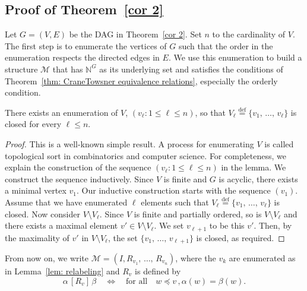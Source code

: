 \documentclass[AHL,Unicode,longabstracts,published]{cedram}
\newcommand*{\defeq}{\stackrel{\mathrm{def}}{=}}
\newcommand*\N{\mathbb{N}}
\newcommand*\MM{\mathcal{M}}
\newcommand*\M{\MM}
\newcommand*\N{\mathbb{N}}
\begin{document}
\subsection{Proof of Theorem~\ref{cor 2}}\label{sec:DAG-exchangeability}

Let $G = (V,E)$ be the DAG in Theorem~\ref{cor 2}. Set $n$ to the cardinality of $V$. The first step is to enumerate the vertices of $G$ such that the order in the enumeration respects the directed edges in $E$. We use this enumeration to build a structure $\M$ that has $\N^G$ as its underlying set and satisfies the conditions of Theorem~\ref{thm: CraneTowsner equivalence relations}, especially the orderly condition.

\begin{lemm}\label{lem: relabeling}
There exists an enumeration of $V$, $(v_\ell : 1 \leq \ell \leq n)$, so that\linebreak
$V_\ell
\defeq \{v_1,\,\ldots,\,v_\ell\}$ is closed for every $\ell \leq n$.
\end{lemm}

\begin{proof}
This is a well-known simple result. A process for enumerating $V$ is called topological sort in combinatorics and computer science. For completeness, we explain the construction of the sequence $(v_\ell : 1 \leq \ell \leq n)$ in the lemma. We construct the sequence inductively. Since $V$ is finite and $G$ is acyclic, there exists a minimal vertex $v_1$. Our inductive construction starts with the sequence $(v_1)$. Assume that we have enumerated $\ell$ elements such that $V_\ell
\defeq \{v_1,\,\ldots,\,v_\ell\}$ is closed. Now consider $V \setminus V_\ell$. Since $V$ is finite and partially ordered, so is $V \setminus V_\ell$ and there exists a maximal element $v' \in V \setminus V_\ell$. We set $v_{\ell+1}$ to be this $v'$. Then, by the maximality of $v'$ in $V \setminus V_\ell$, the set $\{v_1,\,\ldots,\,v_{\ell+1}\}$ is closed, as required.
\end{proof}

From now on, we write $\MM=(I,R_{v_1},\,\ldots,\,R_{v_n})$, where the $v_k$ are enumerated as in Lemma~\ref{lem: relabeling} and $R_v$ is defined by
\[
\alpha\,[R_v]\,\beta\quad\iff\quad
\text{for all}\quad w \preceq v\,, \alpha(w) = \beta(w).
\]
\end{document}
